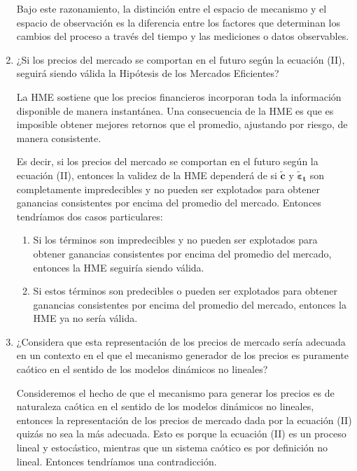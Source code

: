 \begin{problema}
\begin{enumerate}
\begin{sol}
\begin{enumerate}
        \end{enumerate}
        Bajo este razonamiento, la distinción entre el espacio de mecanismo y el espacio de observación es la diferencia entre los factores que determinan los cambios del proceso a través del tiempo y las mediciones o datos observables.
    \end{sol}
    \item  ¿Si los precios del mercado se comportan en el futuro según la ecuación (II), seguirá siendo válida la Hipótesis de los Mercados Eficientes?
    \begin{sol}
        
        La HME sostiene que los precios financieros incorporan toda la información disponible de manera instantánea. Una consecuencia de la HME es que es imposible obtener mejores retornos que el promedio, ajustando por riesgo, de manera consistente.

        Es decir, si los precios del mercado se comportan en el futuro según la ecuación (II), entonces la validez de la HME dependerá de si $\tilde{\boldsymbol{c}}$ y $\tilde{\boldsymbol{\varepsilon}}_{\mathbf{t}}$ son completamente impredecibles y no pueden ser explotados para obtener ganancias consistentes por encima del promedio del mercado. Entonces tendríamos dos casos particulares: 
        \begin{enumerate}
            \item Si los términos son impredecibles y no pueden ser explotados para obtener ganancias consistentes por encima del promedio del mercado, entonces la HME seguiría siendo válida. 
            \item Si estos términos son predecibles o pueden ser explotados para obtener ganancias consistentes por encima del promedio del mercado, entonces la HME ya no sería válida.
        \end{enumerate}


    \end{sol}
    \item ¿Considera que esta representación de los precios de mercado sería adecuada en un contexto en el que el mecanismo generador de los precios es puramente caótico en el sentido de los modelos dinámicos no lineales?
    \begin{sol}
        Consideremos el hecho de que el mecanismo para generar los precios es de naturaleza caótica en el sentido de los modelos dinámicos no lineales, entonces la representación de los precios de mercado dada por la ecuación (II) quizás no sea la más adecuada. Esto es porque la ecuación (II) es un proceso lineal y estocástico, mientras que un sistema caótico es por definición no lineal. Entonces tendríamos una contradicción. 


\end{sol}
\end{enumerate}
\end{problema}
